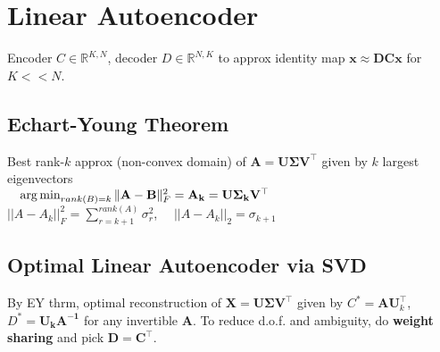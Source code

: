 


\section{Linear Autoencoder}
Encoder $C \in \mathbb{R}^{K,N}$, decoder $D \in \mathbb{R}^{N,K}$ to approx identity map $\mathbf{x \approx DCx}$ for $K << N$.
\subsection*{Echart-Young Theorem} 
Best rank-$k$ approx (non-convex domain) of $\mathbf{A = U \Sigma V^\top}$ given by $k$ largest eigenvectors\\
$\quad \operatorname*{arg\,min}_{rank(B)=k}\|\mathbf{A-B}\|_F^2 = \mathbf{A_k = U\Sigma_k V^\top}$ \\
$||A-A_k||_F^2 = \sum_{r=k+1}^{rank(A)} \sigma_r^2 $,
$\quad||A-A_k||_2 = \sigma_{k+1}$
\subsection*{Optimal Linear Autoencoder via SVD}
By EY thrm, optimal reconstruction of $\mathbf{X = U \Sigma V^\top}$ given by $C^*=\mathbf{AU}^\top_k$, $D^*=\mathbf{U_kA^{-1}}$ for any invertible $\mathbf{A}$. To reduce d.o.f. and ambiguity, do \textbf{weight sharing} and pick $\mathbf{D=C^\top}$.


